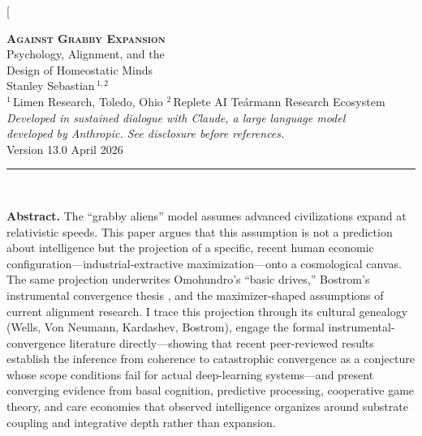 \documentclass[11pt,a4paper,twocolumn]{article}
\begin{document}
\twocolumn[{%
\begin{center}
\vspace*{-0.3cm}
{\LARGE\bfseries\scshape Against Grabby Expansion}\\[6pt]
{\large Psychology, Alignment, and the\\Design of Homeostatic Minds}\\[14pt]
{\normalsize Stanley Sebastian\,$^{1,2}$}\\[3pt]
{\small $^1$\,Limen Research, Toledo, Ohio \quad
$^2$\,Replete AI \textnormal{\textperiodcentered} Te\'armann Research Ecosystem}\\[6pt]
{\footnotesize\itshape\textcolor{epigraph}{Developed in sustained dialogue with Claude, a large language model\\developed by Anthropic. See disclosure before references.}}\\[10pt]
{\small Version 13.0 \textnormal{\textperiodcentered} April 2026}\\[14pt]
\textcolor{rulecolor}{\rule{0.5\textwidth}{0.4pt}}\\[10pt]
\end{center}

\begin{center}
\begin{minipage}{0.92\textwidth}
\small
\textbf{Abstract.} The ``grabby aliens'' model \citep{hanson2021} assumes
advanced civilizations expand at relativistic speeds. This paper argues
that this assumption is not a prediction about intelligence but the
projection of a specific, recent human economic configuration---industrial-extractive
maximization---onto a cosmological canvas. The same projection underwrites
Omohundro's ``basic drives,'' Bostrom's instrumental convergence thesis
\citep{bostrom2012,bostrom2014}, and the maximizer-shaped assumptions
of current alignment research. I trace this projection through its
cultural genealogy (Wells, Von Neumann, Kardashev, Bostrom), engage the
formal instrumental-convergence literature directly---showing that
recent peer-reviewed results \citep{gallow2024,sharadin2025,muller2022}
establish the inference from coherence to catastrophic convergence as
a conjecture whose scope conditions fail for actual deep-learning
systems---and present converging evidence from basal cognition,
predictive processing, cooperative game theory, and care economies
that observed intelligence organizes around substrate coupling and
integrative depth rather than expansion.


\end{minipage}
\end{center}}
\end{document}
